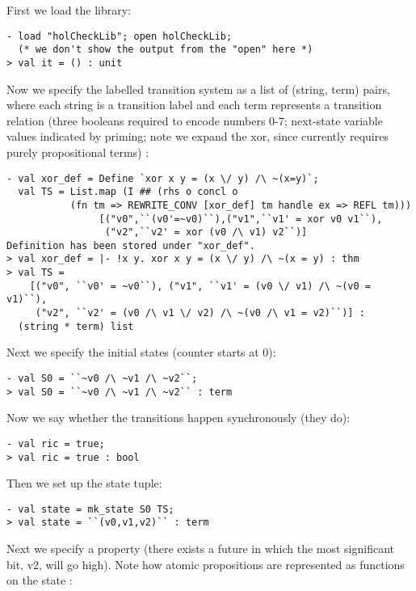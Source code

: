 First we load the \hc{} library: 
\begin{session}\begin{verbatim}
- load "holCheckLib"; open holCheckLib;
  (* we don't show the output from the "open" here *)
> val it = () : unit
\end{verbatim}\end{session}
Now we specify the labelled transition system as a list of
(string, term) pairs, where each string is a transition label and
each term represents a transition relation (three booleans
required to encode numbers 0-7; next-state variable values
indicated by priming; note we expand the xor, since \hc{} 
currently requires purely propositional terms) :
\begin{session}\begin{verbatim}
- val xor_def = Define `xor x y = (x \/ y) /\ ~(x=y)`;
  val TS = List.map (I ## (rhs o concl o
           (fn tm => REWRITE_CONV [xor_def] tm handle ex => REFL tm)))
                [("v0",``(v0'=~v0)``),("v1",``v1' = xor v0 v1``),
                 ("v2",``v2' = xor (v0 /\ v1) v2``)]
Definition has been stored under "xor_def".
> val xor_def = |- !x y. xor x y = (x \/ y) /\ ~(x = y) : thm
> val TS =
    [("v0", ``v0' = ~v0``), ("v1", ``v1' = (v0 \/ v1) /\ ~(v0 = v1)``),
     ("v2", ``v2' = (v0 /\ v1 \/ v2) /\ ~(v0 /\ v1 = v2)``)] :
  (string * term) list
\end{verbatim}\end{session}
Next we specify the initial states (counter starts at 0):
\begin{session}\begin{verbatim}
- val S0 = ``~v0 /\ ~v1 /\ ~v2``;
> val S0 = ``~v0 /\ ~v1 /\ ~v2`` : term
\end{verbatim}\end{session}
Now we say whether the transitions happen synchronously (they do):
\begin{session}\begin{verbatim}
- val ric = true;
> val ric = true : bool
\end{verbatim}\end{session}
Then we set up the state tuple:
\begin{session}\begin{verbatim}
- val state = mk_state S0 TS;
> val state = ``(v0,v1,v2)`` : term
\end{verbatim}\end{session}
Next we specify a property (there exists a future in which the most significant bit, v2, will go high). Note how atomic propositions are represented as functions on the state :

